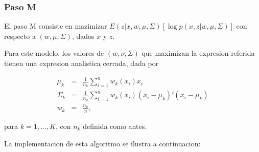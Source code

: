 \documentclass[11pt,]{article}
\begin{document}
\subsubsection{Paso M}\label{paso-m}

El paso M consiste en mazimizar
\(E(z|x,w,\mu,\Sigma)\left[\log p(x,z|w,\mu,\Sigma)\right]\) con
respecto a \((w,\mu,\Sigma)\), dados \(x\) y \(z\).

Para este modelo, los valores de \((w,\nu,\Sigma)\) que maximizan la
expresion referida tienen una expresion analistica cerrada, dada por

\begin{eqnarray}
  \mu_k & = & \frac{1}{n_k}\sum_{i=1}^{n}w_k(x_i)x_i \\
  \Sigma_k & = & \frac{1}{n_k}\sum_{i=1}^{n} w_k(x_i)(x_i-\mu_k)'(x_i-\mu_k) \\
  w_k & = & \frac{n_k}{n},
\end{eqnarray}

para \(k=1,\ldots,K\), con \(n_k\) definida como antes.

La implementacion de esta algoritmo se ilustra a continuacion:
\end{document}
